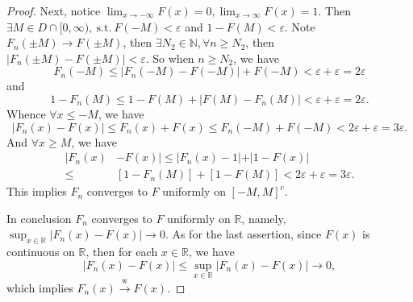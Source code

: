 \documentclass[12pt]{article}
\renewcommand{\(}{\left(}%
\renewcommand{\)}{\right)}%
\renewcommand{\[}{\left[}%
\renewcommand{\]}{\right]}%
\renewcommand{\r}{\mathbb{R}}
\newcommand{\n}{\mathbb{N}}
\newcommand{\st}{\mathrm{\ s.t.\ }}
\newtheorem{proof}{Proof.}}
\begin{document}
\begin{proof}
   Next, notice $\lim_{x\to-\infty}F(x)=0,\lim_{x\to\infty}F(x)=1$. Then $\exists M\in D\cap [0,\infty) ,\st F(-M)<\varepsilon$ and $1-F(M)<\varepsilon$. Note $F_n(\pm M)\to F(\pm M)$, then $\exists N_2\in\n,\forall n\geq N_2$, then $|F_n(\pm M)-F(\pm M)|<\varepsilon$. So when $n\geq N_2$, we have
   \begin{equation*}
    F_n(-M)\leq |F_n(-M)-F(-M)|+F(-M)<\varepsilon+\varepsilon=2\varepsilon
   \end{equation*}
   and
   \begin{equation*}
    1-F_n(M)\leq 1-F(M)+|F(M)-F_n(M)|<\varepsilon+\varepsilon=2\varepsilon.
   \end{equation*}
   Whence $\forall x\leq -M$, we have
   \begin{equation*}
    |F_n(x)-F(x)|\leq F_n(x)+F(x)\leq F_n(-M)+F(-M)<2\varepsilon+\varepsilon=3\varepsilon.
   \end{equation*}
   And $\forall x\geq M$, we have
   \begin{equation*}
    \begin{split}
     |F_n(x)&-F(x)|\leq |F_n(x)-1|+|1-F(x)|\\
     \leq& \[1-F_n(M)\]+\[1-F(M)\]<2\varepsilon+\varepsilon=3\varepsilon.
    \end{split}
   \end{equation*}
   This implies $F_n$ converges to $F$ uniformly on $[-M,M]^c$.

   In conclusion $F_n$ converges to $F$ uniformly on $\r$, namely, $\sup_{x\in\r}|F_n(x)-F(x)|\to 0$. As for the last assertion, since $F(x)$ is continuous on $\r$, then for each $x\in\r$, we have
   \begin{equation*}
    |F_n(x)-F(x)|\leq \sup_{x\in\r}|F_n(x)-F(x)|\to 0,
   \end{equation*}
   which implies $F_n(x)\overset{\mathrm{w}}{\to}F(x)$.
  \end{proof}
\end{document}
